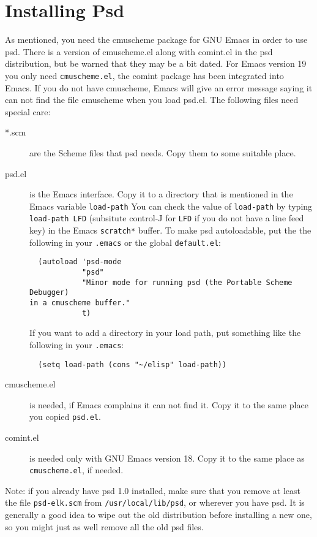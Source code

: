 \section{Installing Psd}

As mentioned, you need the cmuscheme package for GNU Emacs in order to
use psd.  There is a version of cmuscheme.el along with comint.el in
the psd distribution, but be warned that they may be a bit dated. For
Emacs version 19 you only need {\tt cmuscheme.el}, the comint
package has been integrated into Emacs.
If you do not have cmuscheme, Emacs will give an error message saying
it can not find the file cmuscheme when you load psd.el.
The following files need special care:
\begin{description}
\item[*.scm] are the Scheme files that psd needs. Copy them to some
  suitable place.

\item[psd.el] is the Emacs interface. Copy it to a directory that is
  mentioned in the Emacs variable {\tt load-path} You can check the
  value of {\tt load-path} by typing {\tt load-path LFD} (subsitute
  control-J for {\tt LFD} if you do not have a line feed key) in the Emacs
  {\tt *scratch*} buffer. To make psd autoloadable, put the the
  following in your {\tt .emacs} or the global {\tt default.el}:

  \begin{verbatim}
  (autoload 'psd-mode
            "psd"
            "Minor mode for running psd (the Portable Scheme Debugger) 
in a cmuscheme buffer."
            t)
  \end{verbatim}

  If you want to add a directory in your load path, put something like
  the following in your {\tt .emacs}:
  \begin{verbatim}
  (setq load-path (cons "~/elisp" load-path))
  \end{verbatim}

\item[cmuscheme.el]
  is needed, if Emacs complains it can not find it. Copy it to the
  same place you copied {\tt psd.el}.

\item[comint.el]
  is needed only with GNU Emacs version 18. Copy it to the same place
  as {\tt cmuscheme.el}, if needed.
\end{description}

Note: if you already have psd 1.0 installed, make sure that you remove
at least the file {\tt psd-elk.scm} from {\tt /usr/local/lib/psd}, or
wherever you have psd. It is generally a good idea to wipe out the old
distribution before installing a new one, so you might just as well
remove all the old psd files.

